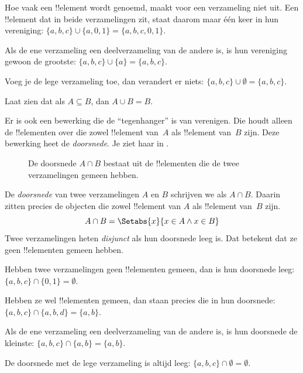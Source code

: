 \documentclass[openany]{memoir}
\begin{document}
\begin{ex}
Hoe vaak een !!{element} wordt genoemd, maakt voor een verzameling niet uit.
Een !!{element} dat in beide verzamelingen zit, staat daarom maar één keer in
hun vereniging: $\{ a, b, c\} \cup \{ a, 0, 1\} = \{a, b, c, 0, 1\}$.

Als de ene verzameling een deelverzameling van de andere is, is hun vereniging
gewoon de grootste: $\{a, b, c \} \cup \{a \} = \{a, b, c\}$.

Voeg je de lege verzameling toe, dan verandert er niets: $\{a,
b, c \} \cup \emptyset = \{a, b, c \}$.
\end{ex}

\begin{prob}
Laat zien dat als $A \subseteq B$, dan $A \cup B = B$.
\end{prob}

\begin{explain}
Er is ook een bewerking die de ``tegenhanger'' is van verenigen. Die houdt
alleen de !!{element}en over die zowel !!{element} van~$A$ als !!{element}
van~$B$ zijn. Deze bewerking heet de \emph{doorsnede}. Je ziet haar in
.
\begin{figure}
  \caption{De doorsnede $A \cap B$ bestaat uit de !!{element}en die de twee
    verzamelingen gemeen hebben.}
\end{figure}
\end{explain}

\begin{defn}[Doorsnede]
De \emph{doorsnede} van twee verzamelingen $A$ en $B$ schrijven we als
$A \cap B$. Daarin zitten precies de objecten die zowel !!{element} van $A$
als !!{element} van~$B$ zijn.
\[
A \cap B = \Setabs{x}{x \in A \land x \in B}
\]
Twee verzamelingen heten \emph{disjunct} als hun doorsnede leeg is. Dat
betekent dat ze geen !!{element}en gemeen hebben.
\end{defn}

\begin{ex}
Hebben twee verzamelingen geen !!{element}en gemeen, dan is hun doorsnede leeg:
$\{ a, b, c\} \cap \{ 0, 1\} = \emptyset$.

Hebben ze wel !!{element}en gemeen, dan staan precies die in hun doorsnede:
$\{a, b, c \} \cap \{a, b, d \} = \{a, b\}$.

Als de ene verzameling een deelverzameling van de andere is, is hun doorsnede
de kleinste: $\{a, b, c\} \cap \{a, b\} = \{a, b\}$.

De doorsnede met de lege verzameling is altijd leeg: $\{a, b, c \}
\cap \emptyset = \emptyset$.
\end{ex}
\end{document}
